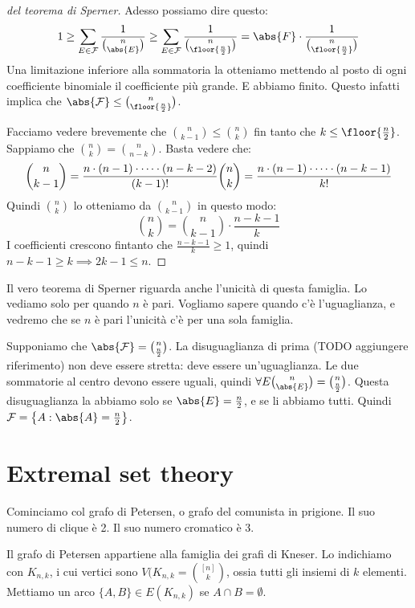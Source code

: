 \begin{proof}[del teorema di Sperner]
	Adesso possiamo dire questo:
	\[
		1 \ge \sum_{E \in \mathcal{F}} \frac{1}{\binom{n}{\abs{E}}} \ge \sum_{E \in \mathcal{F}} \frac{1}{\binom{n}{\floor{\frac{n}{2}}}} = \abs{F} \cdot \frac{1}{\binom{n}{\floor{\frac{n}{2}}}}
	\]
	Una limitazione inferiore alla sommatoria la otteniamo mettendo al posto di ogni coefficiente binomiale il coefficiente pi\`u grande.
	E abbiamo finito.
	Questo infatti implica che $\abs{\mathcal{F}} \le \binom{n}{\floor{\frac{n}{2}}}$.

	Facciamo vedere brevemente che $\binom{n}{k-1} \le \binom{n}{k}$ fin tanto che $k \le \floor{\frac{n}{2}}$.
	Sappiamo che $\binom{n}{k} = \binom{n}{n - k}$.
	Basta vedere che:
	\[
		\binom{n}{k-1} = \frac{n \cdot (n-1) \cdot \dots \cdot (n - k - 2)}{(k-1)!} \\
		\binom{n}{k} = \frac{n \cdot (n-1) \cdot \dots \cdot (n - k - 1)}{k!}
	\]
	Quindi $\binom{n}{k}$ lo otteniamo da $\binom{n}{k-1}$ in questo modo:
	\[
		\binom{n}{k} = \binom{n}{k-1} \cdot \frac{n - k - 1}{k}
	\]
	I coefficienti crescono fintanto che $\frac{n - k - 1}{k} \ge 1$, quindi $n - k - 1 \ge k \implies 2 k - 1 \le n$.
\end{proof}

Il vero teorema di Sperner riguarda anche l'unicit\`a di questa famiglia.
Lo vediamo solo per quando $n$ \`e pari.
Vogliamo sapere quando c'\`e l'uguaglianza, e vedremo che se $n$ \`e pari l'unicit\`a c'\`e per una sola famiglia.

Supponiamo che $\abs{\mathcal{F}} = \binom{n}{\frac{n}{2}}$.
La disuguaglianza di prima (TODO aggiungere riferimento) non deve essere stretta: deve essere un'uguaglianza.
Le due sommatorie al centro devono essere uguali, quindi $\forall E \binom{n}{\abs{E}} = \binom{n}{\frac{n}{2}}$.
Questa disuguaglianza la abbiamo solo se $\abs{E} = \frac{n}{2}$, e se li abbiamo tutti.
Quindi $\mathcal{F} = \left\{ A : \abs{A} = \frac{n}{2} \right\}$.

\section{Extremal set theory}

Cominciamo col grafo di Petersen, o grafo del comunista in prigione.
Il suo numero di clique \`e 2.
Il suo numero cromatico \`e 3.

Il grafo di Petersen appartiene alla famiglia dei grafi di Kneser.
Lo indichiamo con $K_{n,k}$, i cui vertici sono $V(K_{n,k} = \binom{[n]}{k}$, ossia tutti gli insiemi di $k$ elementi.
Mettiamo un arco $\{A,B\} \in E(K_{n,k})$ se $A \cap B = \emptyset$.

